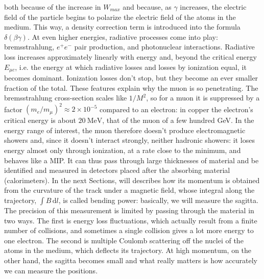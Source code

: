 \documentclass[11pt,a4paper,twoside,openright]{report}
\begin{document}
both because of the increase in $W_{max}$ and because, as $\gamma$ increases, the electric field of the particle begins to polarize the electric field of the atoms in the medium. This way, a density correction term is introduced into the formula $\delta(\beta\gamma)$. At even higher energies, radiative processes come into play: bremsstrahlung, $e^+e^-$ pair production, and photonuclear interactions. Radiative loss increases approximately linearly with energy and, beyond the critical energy $E_{\mu c}$, i.e. the energy at which radiative losses and losses by ionization equal, it becomes dominant. Ionization losses don't stop, but they become an ever smaller fraction of the total. These features explain why the muon is so penetrating. The bremsstrahlung cross-section scales like $1/M^2$, so for a muon it is suppressed by a factor $(m_e/m_\mu)^2 \approx 2\times10^{-5}$ compared to an electron: in copper the electron's critical energy is about $20~\mathrm{MeV}$, that of the muon of a few hundred GeV. In the energy range of interest, the muon therefore doesn’t produce electromagnetic showers and, since it doesn’t interact strongly, neither hadronic showers: it loses energy almost only through ionization, at a rate close to the minimum, and behaves like a MIP. It can thus pass through large thicknesses of material and be identified and measured in detectors placed after the absorbing material (calorimeters). In the next Sections, will describes how its momentum is obtained from the curvature of the track under a magnetic field, whose integral along the trajectory,  $\int B\,\mathrm{d}l$, is called bending power: basically, we will measure the sagitta. The precision of this measurement is limited by passing through the material in two ways. The first is energy loss fluctuations, which actually result from a finite number of collisions, and sometimes a single collision gives a lot more energy to one electron. The second is multiple Coulomb scattering off the nuclei of the atoms in the medium, which deflects its trajectory. At high momentum, on the other hand, the sagitta becomes small and what really matters is how accurately we can measure the positions.
\end{document}
